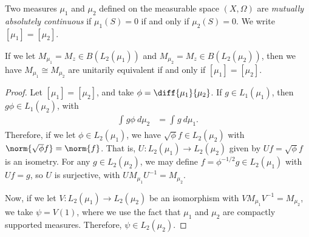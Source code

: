 \documentclass[10pt]{mypackage}
\begin{document}
\begin{definition}
  Two measures $\mu_1$ and $\mu_2$ defined on the measurable space $\left( X,\Omega \right)$ are \textit{mutually absolutely continuous} if $\mu_1(S) = 0$ if and only if $\mu_2(S) = 0$. We write $\left[ \mu_1 \right] = \left[ \mu_2 \right]$.
\end{definition}
\begin{theorem}
  If we let $M_{\mu_1} = M_z\in B\left(L_2\left( \mu_1 \right)\right)$ and $M_{\mu_2} = M_z\in B\left( L_2\left( \mu_2 \right) \right)$, then we have $M_{\mu_1}\cong M_{\mu_2}$ are unitarily equivalent if and only if $\left[ \mu_1 \right] = \left[ \mu_2 \right]$.
\end{theorem}
\begin{proof}
  Let $\left[ \mu_1 \right] = \left[ \mu_2 \right]$, and take $\phi = \diff{\mu_1}{\mu_2}$. If $g\in L_1\left( \mu_1 \right)$, then $g\phi\in L_{1}\left( \mu_2 \right)$, with
  \begin{align*}
    \int_{}^{} g\phi\:d\mu_2 &= \int_{}^{} g\:d\mu_1.
  \end{align*}
  Therefore, if we let $\phi\in L_2\left( \mu_1 \right)$, we have $\sqrt{\phi}f\in L_2\left( \mu_2 \right)$ with $\norm{\sqrt{\phi}f} = \norm{f}$. That is, $U\colon L_2\left( \mu_1 \right)\rightarrow L_2\left( \mu_2 \right)$ given by $Uf = \sqrt{\phi}f$ is an isometry. For any $g\in L_2\left( \mu_2 \right)$, we may define $f = \phi^{-1/2}g\in L_2\left( \mu_1 \right)$ with $Uf = g$, so $U$ is surjective, with $UM_{\mu_1}U^{-1} = M_{\mu_2}$.

  Now, if we let $V\colon L_2\left( \mu_1 \right)\rightarrow L_2\left( \mu_2 \right)$ be an isomorphism with $VM_{\mu_1}V^{-1} = M_{\mu_2}$, we take $\psi = V(1)$, where we use the fact that $\mu_1$ and $\mu_2$ are compactly supported measures. Therefore, $\psi\in L_2\left( \mu_2 \right)$. 
\end{proof}
\end{document}
